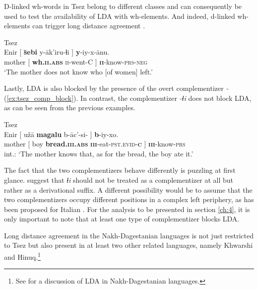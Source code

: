 \documentclass[output=paper
,modfonts
,nonflat]{langsci/langscibook}
\begin{document}
D-linked wh-words in Tsez belong to different classes and can consequently be used to test the availability of LDA with wh-elements. And indeed, d-linked wh-elements can trigger long distance agreement .
\begin{exe}
	\ex Tsez \citep[][fn. 20]{Polinsky_Potsdam2001} \label{ex:tsez_wh_dlinked}\\
		\gll Enir [ \textbf{\u{s}ebi} y-\=ak'iru-ɬi ] \textbf{y}-iy-x-\={a}nu.\\
			 mother [ \textbf{wh.\textsc{ii.abs}} \textsc{ii}-went-C ] \textbf{\textsc{ii}}-know-\textsc{prs-neg}\\
		\glt `The mother does not know who [of women] left.'
\end{exe}
Lastly, LDA is also blocked by the presence of the overt complementizer \textit{-\textcrlambdain} (\ref{ex:tsez_comp_block}). In contrast, the complementizer \textit{-ɬi} does not block LDA, as can be seen from the previous examples.
\begin{exe}
	\ex Tsez \citep[][635]{Polinsky_Potsdam2001}\label{ex:tsez_comp_block}\\
		\gll *Enir [ u\v{z}\=a \textbf{magalu} b-\=ac’-si-\textbf{\textcrlambdain} ] \textbf{b}-iy-xo.\\
			 mother [ boy \textbf{bread.\textsc{\textbf{iii}.abs}} \textsc{\textbf{iii}}-eat-\textsc{pst.evid}-\textsc{\textbf{c}} ]	\textsc{\textbf{iii}}-know-\textsc{prs}\\
		\glt int.: `The mother knows that, as for the bread, the boy ate it.'
\end{exe}
The fact that the two complementizers behave differently is puzzling at first glance. \citet[][fn 19]{Polinsky_Potsdam2001} suggest that \textit{ɬi} should not be treated as a complementizer at all but rather as a derivational suffix. A different possibility would be to assume that the two complementizers occupy different positions in a complex left periphery, as has been proposed for Italian \citep{Ledgeway2005}. For the analysis to be presented in section \ref{ch:4}, it is only important to note that at least one type of complementizer blocks LDA.

Long distance agreement in the Nakh-Dagestanian languages is not just restricted to Tsez but also present in at least two other related languages, namely Khwarshi and Hinuq.\footnote{See  for a discussion of LDA in Nakh-Dagestanian languages.}
\end{document}
